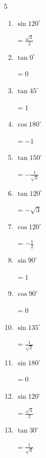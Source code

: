 \begin{multicols}{5}
\begin{enumerate}
  \item $\displaystyle \sin{120^\circ}$

        $\displaystyle =\frac{\sqrt{3}}{2}$

  \item $\displaystyle \tan{0^\circ}$

        $\displaystyle =0$

  \item $\displaystyle \tan{45^\circ}$

        $\displaystyle =1$

  \item $\displaystyle \cos{180^\circ}$

        $\displaystyle =-1$

  \item $\displaystyle \tan{150^\circ}$

        $\displaystyle =-\frac{1}{\sqrt{3}}$

  \item $\displaystyle \tan{120^\circ}$

        $\displaystyle =-\sqrt{3}$

  \item $\displaystyle \cos{120^\circ}$

        $\displaystyle =-\frac{1}{2}$

\columnbreak %

\resetques

  \item $\displaystyle \sin{90^\circ}$

        $\displaystyle =1$

  \item $\displaystyle \cos{90^\circ}$

        $\displaystyle =0$

  \item $\displaystyle \sin{135^\circ}$

        $\displaystyle =\frac{1}{\sqrt{2}}$

  \item $\displaystyle \sin{180^\circ}$

        $\displaystyle =0$

  \item $\displaystyle \sin{120^\circ}$

        $\displaystyle =\frac{\sqrt{3}}{2}$

  \item $\displaystyle \tan{30^\circ}$

        $\displaystyle =\frac{1}{\sqrt{3}}$


\end{enumerate}
\end{multicols}
